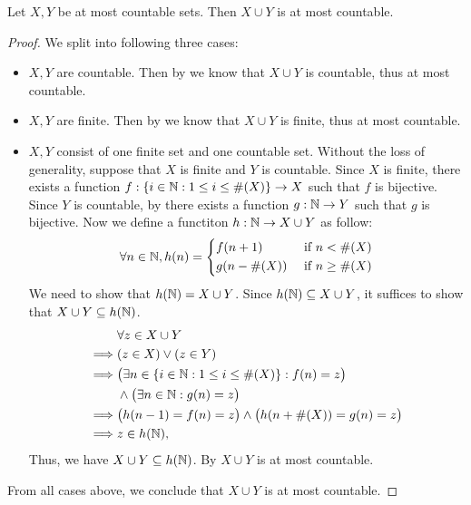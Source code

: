 \begin{ac}\label{i:ac:8.1.1}
  Let \(X, Y\) be at most countable sets.
  Then \(X \cup Y\) is at most countable.
\end{ac}

\begin{proof}
  We split into following three cases:
  \begin{itemize}
    \item \(X, Y\) are countable.
          Then by  we know that \(X \cup Y\) is countable, thus at most countable.
    \item \(X, Y\) are finite.
          Then by  we know that \(X \cup Y\) is finite, thus at most countable.
    \item \(X, Y\) consist of one finite set and one countable set.
          Without the loss of generality, suppose that \(X\) is finite and \(Y\) is countable.
          Since \(X\) is finite, there exists a function \(f : \left\lbrace i \in \mathbb{N} : 1 \leq i \leq \#(X)\right\rbrace \to X\) such that \(f\) is bijective.
          Since \(Y\) is countable, by  there exists a function \(g : \mathbb{N} \to Y\) such that \(g\) is bijective.
          Now we define a functiton \(h : \mathbb{N} \to X \cup Y\) as follow:
          \[
            \forall n \in \mathbb{N}, h(n) = \begin{dcases}
              f(n + 1)     & \text{ if } n < \#(X)    \\
              g(n - \#(X)) & \text{ if } n \geq \#(X)
            \end{dcases}
          \]
          We need to show that \(h(\mathbb{N}) = X \cup Y\).
          Since \(h(\mathbb{N}) \subseteq X \cup Y\), it suffices to show that \(X \cup Y \subseteq h(\mathbb{N})\).
          \begin{align*}
                     & \forall z \in X \cup Y                                                  \\
            \implies & (z \in X) \lor (z \in Y)                                                \\
            \implies & \big(\exists n \in \left\lbrace i \in \mathbb{N} : 1 \leq i \leq \#(X)\right\rbrace : f(n) = z\big) \\
                     & \land \big(\exists n \in \mathbb{N} : g(n) = z\big)                             \\
            \implies & \big(h(n - 1) = f(n) = z\big) \land \big(h(n + \#(X)) = g(n) = z\big)   \\
            \implies & z \in h(\mathbb{N}),
          \end{align*}
          Thus, we have \(X \cup Y \subseteq h(\mathbb{N})\).
          By  \(X \cup Y\) is at most countable.
  \end{itemize}
  From all cases above, we conclude that \(X \cup Y\) is at most countable.
\end{proof}


